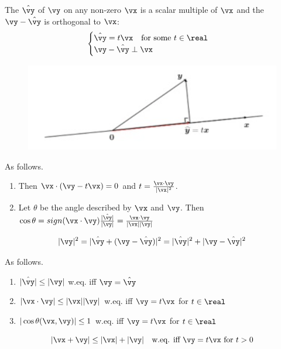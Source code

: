 \documentclass[11pt]{article}
\numberwithin{equation}{section}
\begin{document}
The  $\hat{\vy}$ of $\vy$ on any non-zero $\vx$ is a scalar multiple of $\vx$ and the  $\vy - \hat{\vy}$ is orthogonal to $\vx$:
\begin{equation}
	\begin{cases}
		\hat{\vy} = t\vx \quad \text{for some $t \in \real$} \\
		\vy - \hat{\vy} \perp \vx
	\end{cases}
\end{equation}
\begin{figure}[H]
	\centering
	\includegraphics[scale=0.5]{p2}
\end{figure}
\remark
As follows.
\begin{enumerate}
	\item Then $\vx \cdot (\vy - t\vx) = 0$ and $t = \frac{\vx \cdot \vy}{|\vx|^2}$.
	\item Let $\theta$ be the angle described by $\vx$ and $\vy$. Then $\cos \theta = sign(\vx \cdot \vy) \frac{|\hat{\vy}|}{|\vy|} = \frac{\vx \cdot \vy}{|\vx||\vy|}$ 
\end{enumerate}

\begin{equation}
	|\vy|^2 = |\hat{\vy} + (\vy - \hat{\vy})|^2 = |\hat{\vy}|^2 + |\vy - \hat{\vy}|^2
\end{equation}

As follows.
\begin{enumerate}
	\item $|\hat{\vy}| \leq |\vy|$ w.eq. iff $\vy = \hat{\vy}$
	\item $|\vx \cdot \vy| \leq |\vx||\vy|$ w.eq. iff $\vy = t\vx$ for $t \in \real$
	\item $|\cos \theta(\vx, \vy)| \leq 1$ w.eq. iff $\vy = t\vx$ for $t \in \real$
\end{enumerate}

\begin{equation}
	|\vx + \vy| \leq |\vx| + |\vy| \quad \text{w.eq. iff $\vy = t\vx$ for $t > 0$}
\end{equation}
\end{document}
